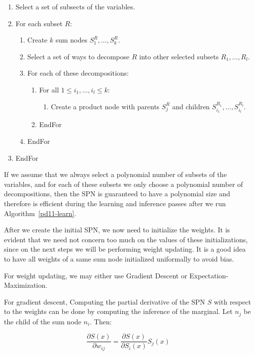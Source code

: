 \documentclass[a4paper,10pt]{article}
\theoremstyle{plain}
\begin{document}
\begin{enumerate}
  \item Select a set of subsects of the variables.
  \item For each subset $R$:
  \begin{enumerate}[label*=\arabic*.]
    \item Create $k$ sum nodes $S_1^R,\ldots,S_k^R$.
    \item Select a set of ways to decompose $R$ into other selected subsets $R_1,\ldots,R_l$.
    \item For each of these decompositions:
    \begin{enumerate}[label*=\arabic*.]
      \item For all $1\leq i_1,\ldots,i_l\leq k$:
      \begin{enumerate}[label*=\arabic*.]
        \item Create a product node with parents $S_j^R$ and children $S_{i_1}^{R_1},\ldots,
          S_{i_l}^{R_l}$.
      \end{enumerate}
      \item EndFor
    \end{enumerate}
  \item EndFor
  \end{enumerate}
  \item EndFor
\end{enumerate}

If we assume that we always select a polynomial number of subsets of the variables, and for each of
these subsets we only choose a polynomial number of decompositions, then the SPN is guaranteed to
have a polynomial size and therefore is efficient during the learning and inference passes after
we run Algorithm~\ref{pd11-learn}.

After we create the initial SPN, we now need to initialize the weights. It is evident that we need
not concern too much on the values of these initializations, since on the next steps we will be
performing weight updating. It is a good idea to have all weights of a same sum node initialized
uniformally to avoid bias.

For weight updating, we may either use Gradient Descent or Expectation-Maximization.

For gradient descent, Computing the partial derivative of the SPN $S$ with respect to the weights
can be done by computing the inference of the marginal. Let $n_j$ be the child of the sum node
$n_i$. Then:

\begin{equation*}
  \frac{\partial S(x)}{\partial w_{ij}} = \frac{\partial S(x)}{\partial S_i(x)}S_j(x)
\end{equation*}
\end{document}

